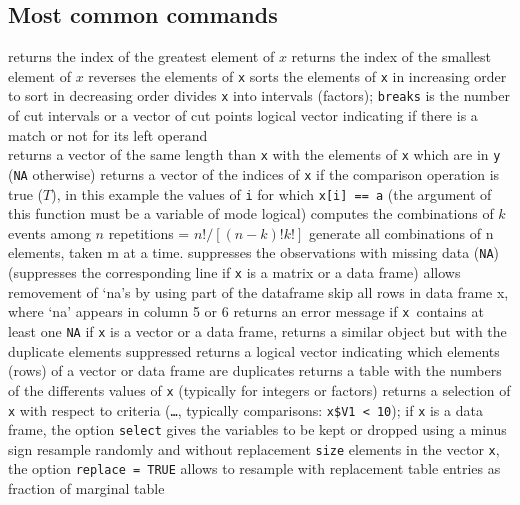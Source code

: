 \subsection{Most common commands}{}
	{ returns the index of the greatest element of $x$}
	{ returns the index of the smallest element of $x$}
	{ reverses the elements of {\tt x}}
	{sorts the elements of {\tt x} in increasing order}
	{to sort in decreasing order}
	{divides {\tt x} into intervals (factors); {\tt breaks} is the number of cut intervals or a vector of cut points}
	{logical vector indicating if there is a match or not for its left operand\\}
	{returns a vector of the same length than {\tt x}
    with the elements of {\tt x} which are in {\tt y} ({\tt NA}
    otherwise)}
	{returns a vector of the indices of {\tt x} if the
comparison operation is true ($T$), in this example the values of {\tt i} for
which {\tt x[i] == a} (the argument of this function must be a variable of mode logical)}
	{ computes the combinations of $k$ events among $n$ repetitions = $n!/[(n-k)!k!]$}
	{ generate all combinations of n elements, taken m at a time.}
	{suppresses the observations with missing data ({\tt NA}) (suppresses the corresponding line if {\tt x} is a matrix or a data frame)}
	{allows removement of `na's by using part of the dataframe} %
	{skip all rows in data frame x, where `na' appears in column 5 or 6}
	{returns an error message if {\tt x }contains at least one {\tt NA}}
	{if {\tt x} is a vector or a data frame, returns a similar object but with the duplicate elements suppressed}
	{returns a logical vector indicating which elements (rows) of a vector or data frame are duplicates}
	{returns a table with the numbers of the differents values of {\tt x} (typically for integers or factors)}
	{returns a selection of {\tt x} with respect to criteria ({\tt \ldots}, typically comparisons: {\tt x\$V1 < 10}); if {\tt x} is a data frame, the option {\tt select} gives the variables to be kept or dropped using a minus sign}
	{resample randomly and without replacement {\tt size}
elements in the vector {\tt x}, the option {\tt replace = TRUE} allows to
resample with replacement}
	{table entries as fraction of marginal table}

